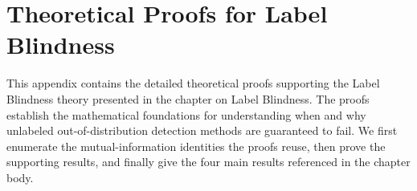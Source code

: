 %
%
%
\chapter{Theoretical Proofs for Label Blindness}
\label{app:proofs}

This appendix contains the detailed theoretical proofs supporting the Label Blindness theory presented in the chapter on Label Blindness. The proofs establish the mathematical foundations for understanding when and why unlabeled out-of-distribution detection methods are guaranteed to fail. We first enumerate the mutual-information identities the proofs reuse, then prove the supporting results, and finally give the four main results referenced in the chapter body.

